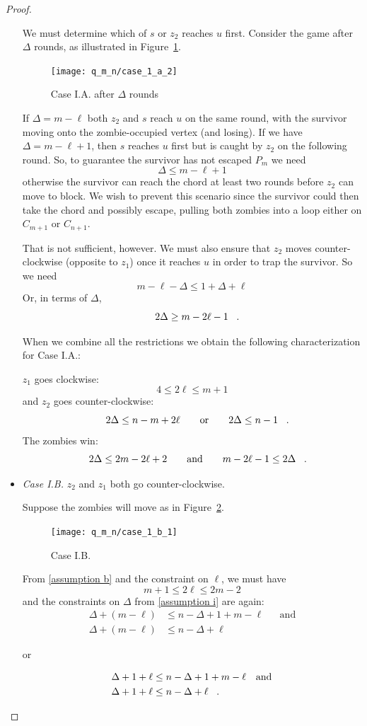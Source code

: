 \begin{proof}
\begin{proofpart}
\begin{itemize}
  We must determine which of $s$ or $z_2$ reaches $u$ first. Consider the game after $\Delta$ rounds, as illustrated in Figure~\ref{fig:case_1_a_2}.

  \begin{figure}
    \centering
    \texttt{[image: q\_m\_n/case\_1\_a\_2]}
    \caption{Case I.A. after $\Delta$ rounds \label{fig:case_1_a_2}}
  \end{figure}

  If $\Delta = m - \ell$ both $z_2$ and $s$ reach $u$ on the same round,
  with the survivor moving onto the zombie-occupied vertex (and losing).
  If we have $\Delta = m - \ell + 1$, then $s$ reaches $u$ first
  but is caught by $z_2$ on the following round.
  So, to guarantee the survivor has not escaped $P_m$ we need
  \[ \Delta \leq m- \ell + 1 \]
  otherwise the survivor can reach the chord at least two rounds
  before $z_2$ can move to block. We wish to prevent this scenario since
  the survivor could then take the chord and possibly escape, pulling
  both zombies into a loop either on $C_{m+1}$ or $C_{n+1}$.

  That is not sufficient, however. We must also ensure that $z_2$ moves
  counter-clockwise (opposite to $z_1$) once it reaches $u$ in order to trap the
  survivor. So we need
  \[ m - \ell - \Delta \leq 1 + \Delta + \ell \]
  Or, in terms of $\Delta$,
  \[ 2 \Delta \geq m - 2\ell  -1 \mperiod \]

  When we combine all the restrictions we obtain the following characterization for Case I.A.:

  $z_1$ goes clockwise:
  \[ 4 \leq 2 \ell \leq m + 1 \]
  and $z_2$ goes counter-clockwise:
  \[ 2 \Delta \leq n - m + 2\ell \qquad \text{or} \qquad 2 \Delta \leq n - 1 \mperiod \]
  The zombies win:
  \[ 2 \Delta \leq 2 m- 2 \ell + 2 \qquad \text{and} \qquad m - 2\ell  -1 \leq 2 \Delta \mperiod \]

  \item \textit{Case I.B.} $z_2$ and $z_1$ both go counter-clockwise.

  Suppose the zombies will move as in Figure~\ref{fig:case_1_b_1}.
  \begin{figure}
    \centering
    \texttt{[image: q\_m\_n/case\_1\_b\_1]}
    \caption{Case I.B. \label{fig:case_1_b_1}}
  \end{figure}

  From \ref{assumption b} and the constraint on $\ell$, we must have
  \[ m + 1 \leq 2 \ell \leq 2m - 2 \]
  and the constraints on $\Delta$ from \ref{assumption i} are again:
  \begin{align*}
   \Delta + (m - \ell) &\leq n - \Delta + 1 + m - \ell && \text{and} \\
   \Delta + (m - \ell) &\leq n - \Delta + \ell
  \end{align*}
  \begin{center}or\end{center}
  \begin{align*}
   \Delta + 1 + \ell &\leq n - \Delta + 1 + m - \ell && \text{and} \\
   \Delta + 1 + \ell &\leq n - \Delta + \ell \mperiod
  \end{align*}


\end{itemize}
\end{proofpart}
\end{proof}
